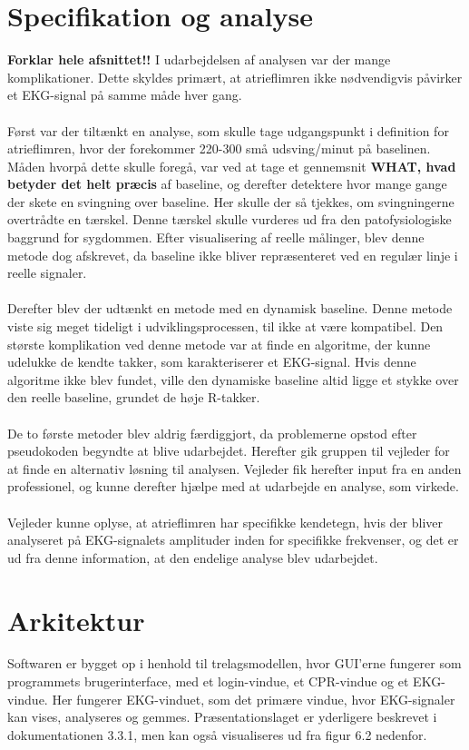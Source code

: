 \section{Specifikation og analyse}

\textbf{Forklar hele afsnittet!!}
I udarbejdelsen af analysen var der mange komplikationer. Dette skyldes primært, at atrieflimren ikke nødvendigvis påvirker et EKG-signal på samme måde hver gang.\\ \\
Først var der tiltænkt en analyse, som skulle tage udgangspunkt i definition for atrieflimren, hvor der forekommer 220-300 små udsving/minut på baselinen. Måden hvorpå dette skulle foregå, var ved at tage et gennemsnit \textbf{WHAT, hvad betyder det helt præcis} af baseline, og derefter detektere hvor mange gange der skete en svingning over baseline. Her skulle der så tjekkes, om svingningerne overtrådte en tærskel. Denne tærskel skulle vurderes ud fra den patofysiologiske baggrund for sygdommen. Efter visualisering af reelle målinger, blev denne metode dog afskrevet, da baseline ikke bliver repræsenteret ved en regulær linje i reelle signaler. \\ \\ 
Derefter blev der udtænkt en metode med en dynamisk baseline. Denne metode viste sig meget tideligt i udviklingsprocessen, til ikke at være kompatibel. Den største komplikation ved denne metode var at finde en algoritme, der kunne udelukke de kendte takker, som karakteriserer et EKG-signal. Hvis denne algoritme ikke blev fundet, ville den dynamiske baseline altid ligge et stykke over den reelle baseline, grundet de høje R-takker. \\ \\
De to første metoder blev aldrig færdiggjort, da problemerne opstod efter pseudokoden begyndte at blive udarbejdet. Herefter gik gruppen til vejleder for at finde en alternativ løsning til analysen. Vejleder fik herefter input fra en anden professionel, og kunne derefter hjælpe med at udarbejde en analyse, som virkede.\\ \\
Vejleder kunne oplyse, at atrieflimren har specifikke kendetegn, hvis der bliver analyseret på EKG-signalets amplituder inden for specifikke frekvenser, og det er ud fra denne information, at den endelige analyse blev udarbejdet. 

\section{Arkitektur}
Softwaren er bygget op i henhold til trelagsmodellen, hvor GUI’erne fungerer som programmets brugerinterface, med et login-vindue, et CPR-vindue og et EKG-vindue. Her fungerer EKG-vinduet, som det primære vindue, hvor EKG-signaler kan vises, analyseres og gemmes. Præsentationslaget er yderligere beskrevet i dokumentationen 3.3.1, men kan også visualiseres ud fra figur 6.2 nedenfor.

